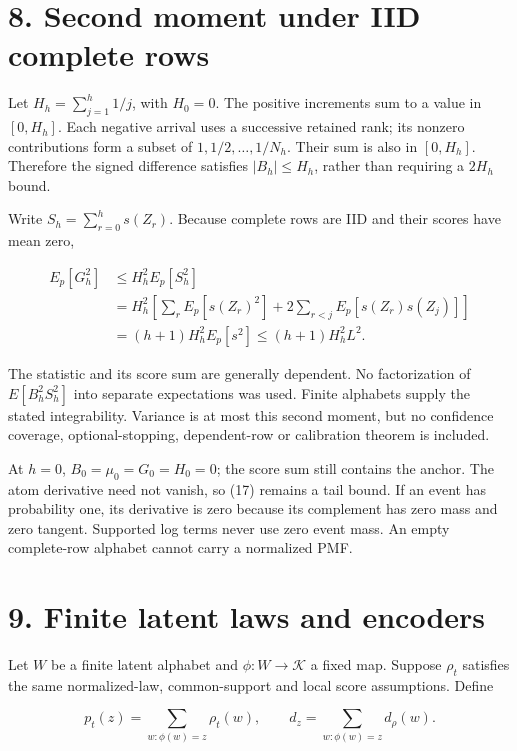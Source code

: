 \documentclass[11pt,a4paper]{article}
\begin{document}
\section{8. Second moment under IID complete rows}\label{second-moment-under-iid-complete-rows}

Let \(H_h=\sum_{j=1}^h1/j\), with \(H_0=0\). The positive increments sum to a value in \([0,H_h]\). Each negative arrival uses a successive retained rank; its nonzero contributions form a subset of \(1,1/2,\ldots,1/N_h\). Their sum is also in \([0,H_h]\). Therefore the signed difference satisfies \(|B_h|\le H_h\), rather than requiring a \(2H_h\) bound.

Write \(S_h=\sum_{r=0}^hs(Z_r)\). Because complete rows are IID and their scores have mean zero,

\[
\begin{aligned}
E_p[G_h^2]&\le H_h^2E_p[S_h^2]\\
&=H_h^2\left[\sum_rE_p[s(Z_r)^2]
+2\sum_{r<j}E_p[s(Z_r)s(Z_j)]\right]\\
&=(h+1)H_h^2E_p[s^2]\le(h+1)H_h^2L^2.
\end{aligned} \tag{20}
\]

The statistic and its score sum are generally dependent. No factorization of \(E[B_h^2S_h^2]\) into separate expectations was used. Finite alphabets supply the stated integrability. Variance is at most this second moment, but no confidence coverage, optional-stopping, dependent-row or calibration theorem is included.

At \(h=0\), \(B_0=\mu_0=G_0=H_0=0\); the score sum still contains the anchor. The atom derivative need not vanish, so (17) remains a tail bound. If an event has probability one, its derivative is zero because its complement has zero mass and zero tangent. Supported log terms never use zero event mass. An empty complete-row alphabet cannot carry a normalized PMF.

\section{9. Finite latent laws and encoders}\label{finite-latent-laws-and-encoders}

Let \(W\) be a finite latent alphabet and \(\phi:W\to\mathcal K\) a fixed map. Suppose \(\rho_t\) satisfies the same normalized-law, common-support and local score assumptions. Define

\[
p_t(z)=\sum_{w:\phi(w)=z}\rho_t(w),\qquad
d_z=\sum_{w:\phi(w)=z}d_\rho(w).
\]
\end{document}
